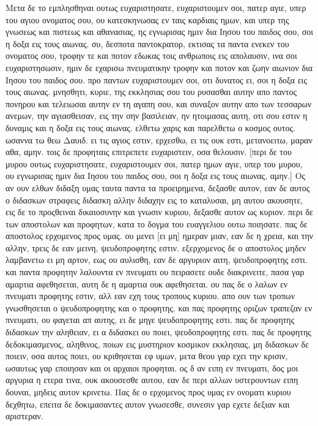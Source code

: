 Μετα δε το εμπλησθηναι ουτως ευχαριστησατε,
ευχαριστουμεν σοι, πατερ αγιε, υπερ του αγιου ονοματος σου, ου κατεσκηνωσας εν ταις καρδιαις ημων, και υπερ της γνωσεως και πιστεως και αθανασιας, ης εγνωρισας ημιν δια Ιησου του παιδος σου, σοι η δοξα εις τους αιωνας.
συ, δεσποτα παντοκρατορ, εκτισας τα παντα ενεκεν του ονοματος σου, τροφην τε και ποτον εδωκας τοις ανθρωποις εις απολαυσιν, ινα σοι ευχαριστησωσιν, ημιν δε εχαρισω πνευματικην τροφην και ποτον και ζωην αιωνιον δια Ιησου του παιδος σου.
προ παντων ευχαριστουμεν σοι, οτι δυνατος ει, σοι η δοξα εις τους αιωνας.
μνησθητι, κυριε, της εκκλησιας σου του ρυσασθαι αυτην απο παντος πονηρου και τελειωσαι αυτην εν τη αγαπη σου, και συναξον αυτην απο των τεσσαρων ανεμων, την αγιασθεισαν, εις την σην βασιλειαν, ην ητοιμασας αυτη, οτι σου εστιν η δυναμις και η δοξα εις τους αιωνας.
ελθετω χαρις και παρελθετω ο κοσμος ουτος. ωσαννα τω θεω Δαυιδ. ει τις αγιος εστιν, ερχεσθω, ει τις ουκ εστι, μετανοειτω, μαραν αθα, αμην.
τοις δε προφηταις επιτρεπετε ευχαριστειν, οσα θελουσιν.
[περι δε του μυρου ουτως ευχαριστησατε,
ευχαριστουμεν σοι, πατερ ημων αγιε, υπερ του μυρου, ου εγνωρισας ημιν δια Ιησου του παιδος σου, σοι η δοξα εις τους αιωνας, αμην.]
Ος αν ουν ελθων διδαξη υμας ταυτα παντα τα προειρημενα, δεξασθε αυτον,
εαν δε αυτος ο διδασκων στραφεις διδασκη αλλην διδαχην εις το καταλυσαι, μη αυτου ακουσητε, εις δε το προςθειναι δικαιοσυνην και γνωσιν κυριου, δεξασθε αυτον ως κυριον.
περι δε των αποστολων και προφητων, κατα το δογμα του ευαγγελιου ουτω ποιησατε.
πας δε αποστολος ερχομενος προς υμας.
ου μενει [ει μη] ημεραν μιαν, εαν δε η χρεια, και την αλλην, τρεις δε εαν μεινη, ψευδοπροφητης εστιν.
εξερχομενος δε ο αποστολος μηδεν λαμβανετω ει μη αρτον, εως ου αυλισθη, εαν δε αργυριον αιτη, ψευδοπροφητης εστι.
και παντα προφητην λαλουντα εν πνευματι ου πειρασετε ουδε διακρινειτε, πασα γαρ αμαρτια αφεθησεται, αυτη δε η αμαρτια ουκ αφεθησεται.
ου πας δε ο λαλων εν πνευματι προφητης εστιν, αλλ εαν εχη τους τροπους κυριου. απο ουν των τροπων γνωσθησεται ο ψευδοπροφητης και ο προφητης.
και πας προφητης οριζων τραπεζαν εν πνευματι, ου φαγεται απ αυτης, ει δε μηγε ψευδοπροφητης εστι.
πας δε προφητης διδασκων την αληθειαν, ει α διδασκει ου ποιει, ψευδοπροφητης εστι.
πας δε προφητης δεδοκιμασμενος, αληθινος, ποιων εις μυστηριον κοσμικον εκκλησιας, μη διδασκων δε ποιειν, οσα αυτος ποιει, ου κριθησεται εφ υμων, μετα θεου γαρ εχει την κρισιν, ωσαυτως γαρ εποιησαν και οι αρχαιοι προφηται.
ος δ αν ειπη εν πνευματι, δος μοι αργυρια η ετερα τινα, ουκ ακουσεσθε αυτου, εαν δε περι αλλων υστερουντων ειπη δουναι, μηδεις αυτον κρινετω.
Πας δε ο ερχομενος προς υμας εν ονοματι κυριου δεχθητω, επειτα δε δοκιμασαντες αυτον γνωσεσθε, συνεσιν γαρ εχετε δεξιαν και αριστεραν.
